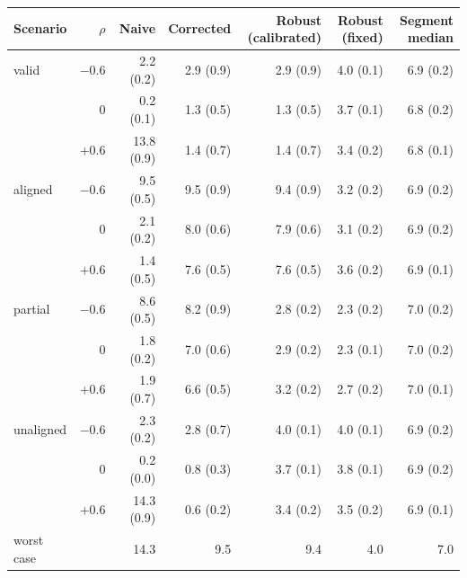 \begin{tabular}{lrrrrrr}
\toprule
Scenario & $\rho$ & Naive & Corrected & Robust (calibrated) & Robust (fixed) & Segment median \\
\midrule
valid & $-0.6$ & 2.2 (0.2) & 2.9 (0.9) & 2.9 (0.9) & 4.0 (0.1) & 6.9 (0.2) \\
 & 0 & 0.2 (0.1) & 1.3 (0.5) & 1.3 (0.5) & 3.7 (0.1) & 6.8 (0.2) \\
 & $+0.6$ & 13.8 (0.9) & 1.4 (0.7) & 1.4 (0.7) & 3.4 (0.2) & 6.8 (0.1) \\
\midrule
aligned & $-0.6$ & 9.5 (0.5) & 9.5 (0.9) & 9.4 (0.9) & 3.2 (0.2) & 6.9 (0.2) \\
 & 0 & 2.1 (0.2) & 8.0 (0.6) & 7.9 (0.6) & 3.1 (0.2) & 6.9 (0.2) \\
 & $+0.6$ & 1.4 (0.5) & 7.6 (0.5) & 7.6 (0.5) & 3.6 (0.2) & 6.9 (0.1) \\
\midrule
partial & $-0.6$ & 8.6 (0.5) & 8.2 (0.9) & 2.8 (0.2) & 2.3 (0.2) & 7.0 (0.2) \\
 & 0 & 1.8 (0.2) & 7.0 (0.6) & 2.9 (0.2) & 2.3 (0.1) & 7.0 (0.2) \\
 & $+0.6$ & 1.9 (0.7) & 6.6 (0.5) & 3.2 (0.2) & 2.7 (0.2) & 7.0 (0.1) \\
\midrule
unaligned & $-0.6$ & 2.3 (0.2) & 2.8 (0.7) & 4.0 (0.1) & 4.0 (0.1) & 6.9 (0.2) \\
 & 0 & 0.2 (0.0) & 0.8 (0.3) & 3.7 (0.1) & 3.8 (0.1) & 6.9 (0.2) \\
 & $+0.6$ & 14.3 (0.9) & 0.6 (0.2) & 3.4 (0.2) & 3.5 (0.2) & 6.9 (0.1) \\
\midrule
worst case &  & 14.3 & 9.5 & 9.4 & 4.0 & 7.0 \\
\bottomrule
\end{tabular}
